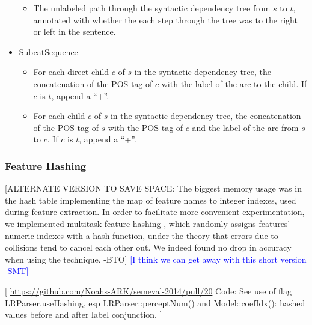\documentclass[11pt]{article}
\newcommand{\bocomment}[1]{\textcolor{Bittersweet}{[#1 -BTO]}}
\newcommand{\sam}[1]{\textcolor{blue}{[#1 -SMT]}}
\newcommand{\codenote}[1]{\textcolor{PineGreen}{[#1]}}
\begin{document}
\begin{itemize}
\begin{itemize}
		\item The unlabeled path through the syntactic dependency tree from $s$ to $t$,
		annotated with whether the each step through the tree was to the right or left in the sentence.
	\end{itemize}
	\item SubcatSequence
		\begin{itemize}
		\item For each direct child $c$ of $s$ in the syntactic dependency tree, the
		concatenation of the POS tag of $c$ with the label of the arc to the child.
		If $c$ is $t$, append a ``+''.
		\item For each child $c$ of $s$ in the syntactic dependency tree, the
		concatenation of the POS tag of $s$ with the POS tag of $c$ and the label of the
		arc from $s$ to $c$.
		If $c$ is $t$, append a ``+''.
	\end{itemize}
\end{itemize}

\subsubsection{Feature Hashing}

\bocomment{ALTERNATE VERSION TO SAVE SPACE:
  The biggest memory usage was in the hash table implementing the map of feature names to integer indexes, used during feature extraction.  In order to facilitate more convenient experimentation, we implemented multitask feature hashing \cite{weinberger_feature_2009}, which randomly assigns features' numeric indexes with a hash function, under the theory that errors due to collisions tend to cancel each other out.  We indeed found no drop in accuracy when using the technique.}
\sam{I think we can get away with this short version}

\codenote{
\url{https://github.com/Noahs-ARK/semeval-2014/pull/20}
Code:
  See use of flag LRParser.useHashing, esp LRParser::perceptNum() 
  and Model::coefIdx(): hashed values before and after label conjunction.
}
\end{document}
